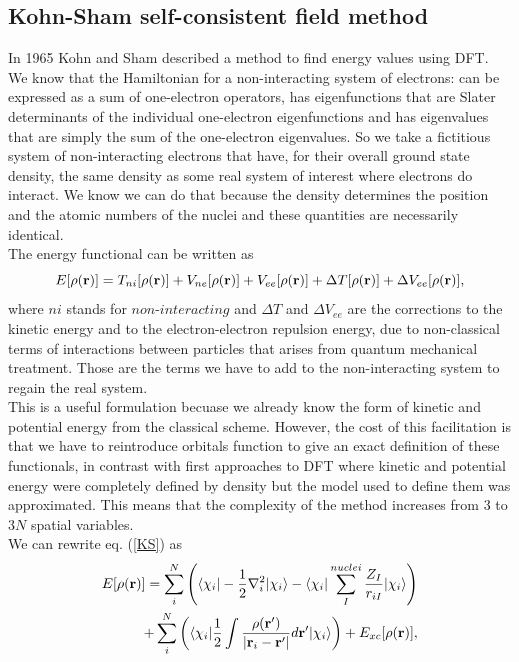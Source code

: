 \subsection{Kohn-Sham self-consistent field method}
In 1965 Kohn and Sham described a method to find energy values using DFT. \\
We know that the Hamiltonian for a non-interacting system of electrons: can be expressed as a sum of one-electron operators, has eigenfunctions that are Slater determinants of the individual one-electron eigenfunctions and has eigenvalues that are simply the sum of the one-electron eigenvalues. So we take a fictitious system of non-interacting electrons that have, for their overall ground state density, the same density as some real system of interest where electrons do interact. We know we can do that because the density determines the position and the atomic numbers of the nuclei and these quantities are necessarily identical. \\
The energy functional can be written as
\begin{equation}
    E[\rho({\bf r})] = T_{ni}[\rho({\bf r})] + V_{ne}[\rho({\bf r})] + V_{ee}[\rho({\bf r})] + \Delta T[\rho({\bf r})] + \Delta V_{ee}[\rho({\bf r})], \label{KS}
\end{equation}
where $ni$ stands for $non$-$interacting$ and $\Delta T$ and $\Delta V_{ee}$ are the corrections to the kinetic energy and to the electron-electron repulsion energy, due to non-classical terms of interactions between particles that arises from quantum mechanical treatment. Those are the terms we have to add to the non-interacting system to regain the real system. \\
This is a useful formulation becuase we already know the form of kinetic and potential energy from the classical scheme. However, the cost of this facilitation is that we have to reintroduce orbitals function to give an exact definition of these functionals, in contrast with first approaches to DFT where kinetic and potential energy were completely defined by density but the model used to define them was approximated. This means that the complexity of the method increases from $3$ to $3N$ spatial variables. \\
We can rewrite eq. (\ref{KS}) as
\begin{equation}
\begin{split}
    E[\rho({\bf r})] = \sum_i^N \left( \langle\chi_i| - \frac{1}{2} \nabla_i^2 |\chi_i\rangle - \langle\chi_i|\sum_I^{nuclei} \frac{Z_I}{r_{iI}} |\chi_i\rangle \right) \\
    + \sum_i^N \left( \langle\chi_i| \frac{1}{2} \int \frac{\rho({\bf r}')}{|{\bf r}_i - {\bf r}'|} d{\bf r}' |\chi_i\rangle \right) + E_{xc}[\rho({\bf r})],
\end{split}
\end{equation}
